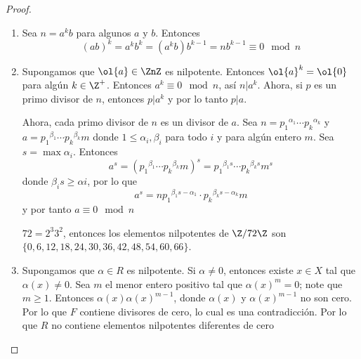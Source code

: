 \begin{problem}[13]
\end{problem}


\begin{proof} \,
    \begin{enumerate}
        \item Sea $n = a^k b$ para algunos $a$ y $b$.
        Entonces $$ (ab)^k = a^k b^k = (a^k b) b^{k-1} = n b^{k-1} \equiv 0 \mod{n} $$
        
        \item Supongamos que $ \ol{a} \in \ZnZ $ es nilpotente. Entonces $ \ol{a}^k = \ol{0} $ para algún $ k \in \Z^+ $. Entonces $a^k \equiv 0 \mod{n}$, así $n | a^k$. Ahora, si $p$ es un primo divisor de $n$, entonces $p | a^k$ y por lo tanto $p | a$.
        
        Ahora, cada primo divisor de $n$ es un divisor de  $a$. Sea $ n = {p_1}^{\alpha_1} \cdots {p_k}^{\alpha_k} $ y $ a = {p_1}^{\beta_1} \cdots {p_k}^{\beta_k} m$ donde $1 \leq \alpha_i, \beta_i$ para todo $i$ y para algún entero $m$. Sea $s = \max{\alpha_i}$. Entonces
        $$ a^s = \left( {p_1}^{\beta_1} \cdots {p_k}^{\beta_k} m \right)^s = {p_1}^{\beta_1 s} \cdots {p_k}^{\beta_k s} m^s$$
        donde $\beta_i s \geq \alpha i$, por lo que
        $$ a^s = n {p_1}^{\beta_1 s - \alpha_1} \cdot {p_k}^{\beta_k s - \alpha_k} m$$
        y por tanto $ a \equiv 0 \mod{n} $
        
        $ 72 = 2^3 3 ^2 $, entonces los elementos nilpotentes de $ \Z / 72\Z $ son  $\{ 0, 6, 12, 18, 24, 30, 36, 42, 48, 54, 60, 66 \}$.
        
        \item Supongamos que $ \alpha \in R $ es nilpotente. Si $\alpha \neq 0$, entonces existe $ x \in X $ tal que $ \alpha(x) \neq 0 $. Sea $m$ el menor entero positivo tal que $ \alpha(x)^m = 0 $; note que $ m \geq 1 $. Entonces $ \alpha(x) {\alpha(x)}^{m-1} $, donde $ \alpha(x) $ y $ {\alpha(x)}^{m-1} $ no son cero. Por lo que $F$ contiene divisores de cero, lo cual es una contradicción. Por lo que $R$ no contiene elementos nilpotentes diferentes de cero
    \end{enumerate}
\end{proof}


